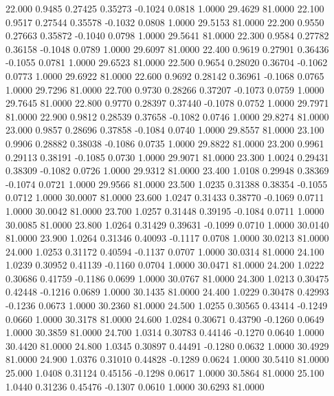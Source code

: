  22.000   0.9485   0.27425   0.35273  -0.1024   0.0818   1.0000  29.4629  81.0000
  22.100   0.9517   0.27544   0.35578  -0.1032   0.0808   1.0000  29.5153  81.0000
  22.200   0.9550   0.27663   0.35872  -0.1040   0.0798   1.0000  29.5641  81.0000
  22.300   0.9584   0.27782   0.36158  -0.1048   0.0789   1.0000  29.6097  81.0000
  22.400   0.9619   0.27901   0.36436  -0.1055   0.0781   1.0000  29.6523  81.0000
  22.500   0.9654   0.28020   0.36704  -0.1062   0.0773   1.0000  29.6922  81.0000
  22.600   0.9692   0.28142   0.36961  -0.1068   0.0765   1.0000  29.7296  81.0000
  22.700   0.9730   0.28266   0.37207  -0.1073   0.0759   1.0000  29.7645  81.0000
  22.800   0.9770   0.28397   0.37440  -0.1078   0.0752   1.0000  29.7971  81.0000
  22.900   0.9812   0.28539   0.37658  -0.1082   0.0746   1.0000  29.8274  81.0000
  23.000   0.9857   0.28696   0.37858  -0.1084   0.0740   1.0000  29.8557  81.0000
  23.100   0.9906   0.28882   0.38038  -0.1086   0.0735   1.0000  29.8822  81.0000
  23.200   0.9961   0.29113   0.38191  -0.1085   0.0730   1.0000  29.9071  81.0000
  23.300   1.0024   0.29431   0.38309  -0.1082   0.0726   1.0000  29.9312  81.0000
  23.400   1.0108   0.29948   0.38369  -0.1074   0.0721   1.0000  29.9566  81.0000
  23.500   1.0235   0.31388   0.38354  -0.1055   0.0712   1.0000  30.0007  81.0000
  23.600   1.0247   0.31433   0.38770  -0.1069   0.0711   1.0000  30.0042  81.0000
  23.700   1.0257   0.31448   0.39195  -0.1084   0.0711   1.0000  30.0085  81.0000
  23.800   1.0264   0.31429   0.39631  -0.1099   0.0710   1.0000  30.0140  81.0000
  23.900   1.0264   0.31346   0.40093  -0.1117   0.0708   1.0000  30.0213  81.0000
  24.000   1.0253   0.31172   0.40594  -0.1137   0.0707   1.0000  30.0314  81.0000
  24.100   1.0239   0.30952   0.41139  -0.1160   0.0704   1.0000  30.0471  81.0000
  24.200   1.0222   0.30686   0.41759  -0.1186   0.0699   1.0000  30.0767  81.0000
  24.300   1.0213   0.30475   0.42448  -0.1216   0.0689   1.0000  30.1435  81.0000
  24.400   1.0229   0.30478   0.42993  -0.1236   0.0673   1.0000  30.2360  81.0000
  24.500   1.0255   0.30565   0.43414  -0.1249   0.0660   1.0000  30.3178  81.0000
  24.600   1.0284   0.30671   0.43790  -0.1260   0.0649   1.0000  30.3859  81.0000
  24.700   1.0314   0.30783   0.44146  -0.1270   0.0640   1.0000  30.4420  81.0000
  24.800   1.0345   0.30897   0.44491  -0.1280   0.0632   1.0000  30.4929  81.0000
  24.900   1.0376   0.31010   0.44828  -0.1289   0.0624   1.0000  30.5410  81.0000
  25.000   1.0408   0.31124   0.45156  -0.1298   0.0617   1.0000  30.5864  81.0000
  25.100   1.0440   0.31236   0.45476  -0.1307   0.0610   1.0000  30.6293  81.0000
